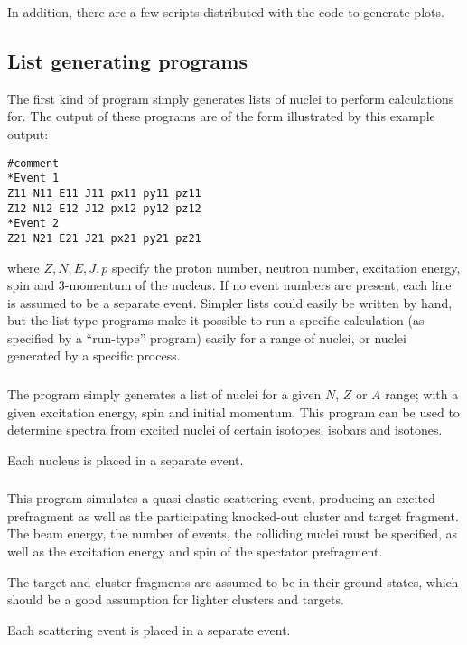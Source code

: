 In addition, there are a few  scripts distributed with the code to generate plots.

\subsection{List generating programs}
The first kind of program simply generates lists of nuclei to perform calculations for. The output of these programs are of the form illustrated by this example output:
\begin{lstlisting}
#comment
*Event 1
Z11 N11 E11 J11 px11 py11 pz11
Z12 N12 E12 J12 px12 py12 pz12
*Event 2
Z21 N21 E21 J21 px21 py21 pz21
\end{lstlisting}
where $Z,N,E,J,p$ specify the proton number, neutron number, excitation energy, spin and 3-momentum of the nucleus. If no event numbers are present, each line is assumed to be a separate event. Simpler lists could easily be written by hand, but the list-type programs make it possible to run a specific calculation (as specified by a ``run-type'' program) easily for a range of nuclei, or nuclei generated by a specific process.

\subsubsection{}
The  program simply generates a list of nuclei for a given $N$, $Z$ or $A$ range; with a given excitation energy, spin and initial momentum. This program can be used to determine spectra from excited nuclei of certain isotopes, isobars and isotones.

Each nucleus is placed in a separate event.

\subsubsection{}
This program simulates a quasi-elastic scattering event, producing an excited prefragment as well as the participating knocked-out cluster and target fragment.
The beam energy, the number of events, the colliding nuclei must be specified, as well as the excitation energy and spin of the spectator prefragment.

The target and cluster fragments are assumed to be in their ground states, which should be a good assumption for lighter clusters and targets.

Each scattering event is placed in a separate event.

